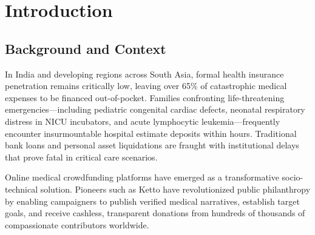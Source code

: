 \documentclass[12pt,a4paper,oneside]{report}
\begin{document}
\clearpage
{}
\setcounter{page}{1}
\tableofcontents

\clearpage
\listoffigures

\clearpage
\listoftables

\clearpage
{}
\setcounter{page}{1}

\chapter{Introduction}

\section{Background and Context}
In India and developing regions across South Asia, formal health insurance penetration remains critically low, leaving over 65\% of catastrophic medical expenses to be financed out-of-pocket. Families confronting life-threatening emergencies—including pediatric congenital cardiac defects, neonatal respiratory distress in NICU incubators, and acute lymphocytic leukemia—frequently encounter insurmountable hospital estimate deposits within hours. Traditional bank loans and personal asset liquidations are fraught with institutional delays that prove fatal in critical care scenarios.

Online medical crowdfunding platforms have emerged as a transformative socio-technical solution. Pioneers such as Ketto have revolutionized public philanthropy by enabling campaigners to publish verified medical narratives, establish target goals, and receive cashless, transparent donations from hundreds of thousands of compassionate contributors worldwide.
\end{document}
